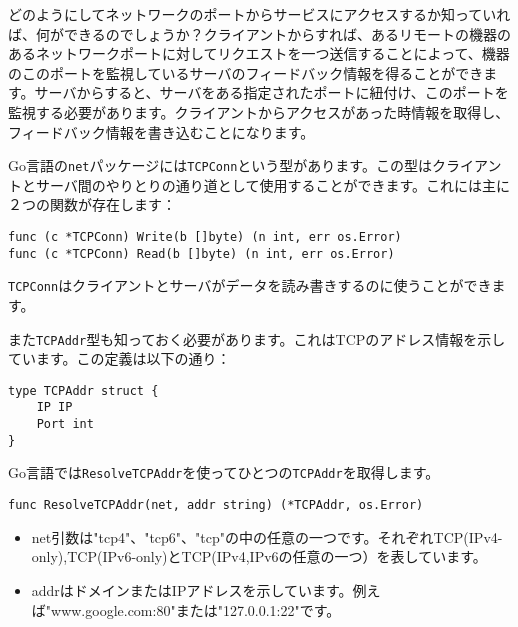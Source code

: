 どのようにしてネットワークのポートからサービスにアクセスするか知っていれば、何ができるのでしょうか？クライアントからすれば、あるリモートの機器のあるネットワークポートに対してリクエストを一つ送信することによって、機器のこのポートを監視しているサーバのフィードバック情報を得ることができます。サーバからすると、サーバをある指定されたポートに紐付け、このポートを監視する必要があります。クライアントからアクセスがあった時情報を取得し、フィードバック情報を書き込むことになります。

Go言語の\texttt{net}パッケージには\texttt{TCPConn}という型があります。この型はクライアントとサーバ間のやりとりの通り道として使用することができます。これには主に２つの関数が存在します：

\begin{lstlisting}[numbers=none]
func (c *TCPConn) Write(b []byte) (n int, err os.Error)
func (c *TCPConn) Read(b []byte) (n int, err os.Error)
\end{lstlisting}

\texttt{TCPConn}はクライアントとサーバがデータを読み書きするのに使うことができます。

また\texttt{TCPAddr}型も知っておく必要があります。これはTCPのアドレス情報を示しています。この定義は以下の通り：

\begin{lstlisting}[numbers=none]
type TCPAddr struct {
    IP IP
    Port int
}
\end{lstlisting}

Go言語では\texttt{ResolveTCPAddr}を使ってひとつの\texttt{TCPAddr}を取得します。



\begin{lstlisting}[numbers=none]
func ResolveTCPAddr(net, addr string) (*TCPAddr, os.Error)
\end{lstlisting}


\begin{itemize}
  \item net引数は"tcp4"、"tcp6"、"tcp"の中の任意の一つです。それぞれTCP(IPv4-only),TCP(IPv6-only)とTCP(IPv4,IPv6の任意の一つ）を表しています。
  \item addrはドメインまたはIPアドレスを示しています。例えば"www.google.com:80"または"127.0.0.1:22"です。
\end{itemize}

